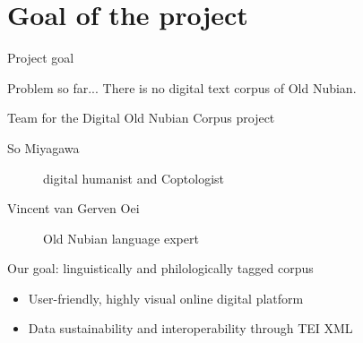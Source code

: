 \documentclass{beamer}
\begin{document}
\section{Goal of the project}

\begin{frame}{Project goal}
  \begin{alertblock}{Problem so far...}
    There is no digital text corpus of Old Nubian.
   \end{alertblock}
   \begin{exampleblock}{Team for the Digital Old Nubian Corpus project}
      \begin{description}
          \item[So Miyagawa] digital humanist and Coptologist 
          \item[Vincent van Gerven Oei] Old Nubian language expert
      \end{description}
  \end{exampleblock}
  \begin{block}{Our goal: linguistically and philologically tagged corpus}
    \begin{itemize}
      \item User-friendly, highly visual online digital platform
      \item Data sustainability and interoperability through TEI XML
    \end{itemize}
  \end{block}
\end{frame}
\end{document}
